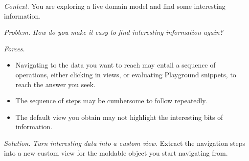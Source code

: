 \documentclass[acmsmall,screen,authorversion,nonacm]{acmart} %
\newcommand\eog[1]{\nbc{Edward}{#1}{purple}}
\newcommand\cp[1]{\nbe{Cesare}{#1}{olive}} %
\newcommand\ws[1]{\nbe{Workshop}{#1}{teal}} %
\newcommand{\patsec}[1]{\noindent\textit{#1.}\xspace}
\begin{document}

\patsec{Context}
You are exploring a live domain model and find some interesting information.

\patsec{Problem}
\emph{How do you make it easy to find interesting information again?}

\patsec{Forces}
\begin{itemize}[---]
\item Navigating to the data you want to reach may entail a sequence of operations, either clicking in views, or evaluating Playground snippets, to reach the answer you seek.
\item The sequence of steps may be cumbersome to follow repeatedly.
\item The default view you obtain may not highlight the interesting bits of information.
\end{itemize}


\patsec{Solution}
\emph{Turn interesting data into a custom view.}
Extract the navigation steps into a new custom view for the moldable object you start navigating from.

\end{document}
